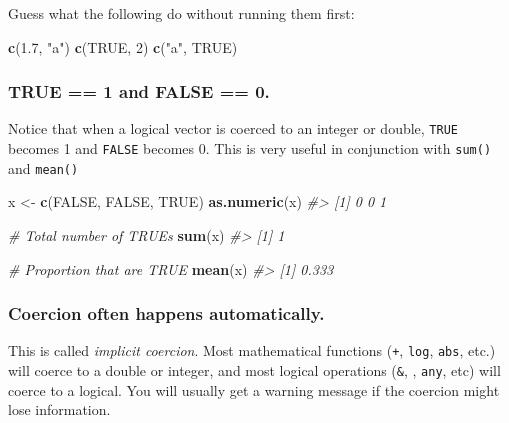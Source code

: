 \documentclass[]{book}
\newenvironment{Shaded}{\begin{snugshade}}{\end{snugshade}}
\newcommand{\KeywordTok}[1]{\textcolor[rgb]{0.13,0.29,0.53}{\textbf{#1}}}
\newcommand{\DecValTok}[1]{\textcolor[rgb]{0.00,0.00,0.81}{#1}}
\newcommand{\FloatTok}[1]{\textcolor[rgb]{0.00,0.00,0.81}{#1}}
\newcommand{\StringTok}[1]{\textcolor[rgb]{0.31,0.60,0.02}{#1}}
\newcommand{\CommentTok}[1]{\textcolor[rgb]{0.56,0.35,0.01}{\textit{#1}}}
\newcommand{\OtherTok}[1]{\textcolor[rgb]{0.56,0.35,0.01}{#1}}
\newcommand{\NormalTok}[1]{#1}
\begin{document}
Guess what the following do without running them first:

\begin{Shaded}
\begin{Highlighting}[]
\KeywordTok{c}\NormalTok{(}\FloatTok{1.7}\NormalTok{, }\StringTok{"a"}\NormalTok{) }
\KeywordTok{c}\NormalTok{(}\OtherTok{TRUE}\NormalTok{, }\DecValTok{2}\NormalTok{) }
\KeywordTok{c}\NormalTok{(}\StringTok{"a"}\NormalTok{, }\OtherTok{TRUE}\NormalTok{) }
\end{Highlighting}
\end{Shaded}

\subsubsection*{TRUE == 1 and FALSE == 0.}\label{true-1-and-false-0.}

Notice that when a logical vector is coerced to an integer or double,
\texttt{TRUE} becomes 1 and \texttt{FALSE} becomes 0. This is very
useful in conjunction with \texttt{sum()} and \texttt{mean()}

\begin{Shaded}
\begin{Highlighting}[]
\NormalTok{x <-}\StringTok{ }\KeywordTok{c}\NormalTok{(}\OtherTok{FALSE}\NormalTok{, }\OtherTok{FALSE}\NormalTok{, }\OtherTok{TRUE}\NormalTok{)}
\KeywordTok{as.numeric}\NormalTok{(x)}
\CommentTok{#> [1] 0 0 1}

\CommentTok{# Total number of TRUEs}
\KeywordTok{sum}\NormalTok{(x)}
\CommentTok{#> [1] 1}

\CommentTok{# Proportion that are TRUE}
\KeywordTok{mean}\NormalTok{(x)}
\CommentTok{#> [1] 0.333}
\end{Highlighting}
\end{Shaded}

\subsubsection*{Coercion often happens
automatically.}\label{coercion-often-happens-automatically.}

This is called \emph{implicit coercion}. Most mathematical functions
(\texttt{+}, \texttt{log}, \texttt{abs}, etc.) will coerce to a double
or integer, and most logical operations (\texttt{\&},
\texttt{\textbar{}}, \texttt{any}, etc) will coerce to a logical. You
will usually get a warning message if the coercion might lose
information.
\end{document}
